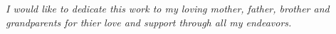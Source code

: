 \clearpage
\vspace*{\fill}
	\begin{center}
		\begin{minipage}{\textwidth}
		\emph{
			I would like to dedicate this work to my loving mother, father, brother and grandparents for thier love and support through all my endeavors. 
		}
		\end{minipage}
	\end{center}
\vfill %
\clearpage